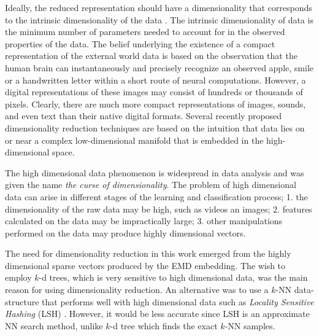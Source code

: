 \iftoggle{edit-mode}{\hspace{0pt}\marginpar{data Intrinsic dimensionality}}{}
Ideally, the reduced representation should have a dimensionality that corresponds to the intrinsic dimensionality of the data \cite{van2009dimensionality}.
The intrinsic dimensionality of data is the minimum number of parameters needed to account for in the observed properties of the data. 
The belief underlying the existence of a compact representation of the external world data is based on the observation that the human brain can instantaneously and precisely recognize an observed apple, smile or a handwritten letter within a short route of neural computations. 
However, a digital representations of these images may consist of hundreds or thousands of pixels. 
Clearly, there are much more compact representations of images, sounds, and even text than their native digital formats. 
Several recently proposed dimensionality reduction techniques are based on the intuition that data lies on or near a complex low-dimensional manifold that is embedded in the high-dimensional space.

\iftoggle{edit-mode}{\hspace{0pt}\marginpar{The curse of dimensionality}}{}
The high dimensional data phenomenon is widespread in data analysis and was given the name \emph{the curse of dimensionality}. 
The problem of high dimensional data can arise in different stages of the learning and classification process; 1. the dimensionality of the raw data may be high, such as videos an images; 2. features calculated on the data may be impractically large; 3. other manipulations performed on the data may produce highly dimensional vectors.

\iftoggle{edit-mode}{\hspace{0pt}\marginpar{Why do we need DR?}}{}
The need for dimensionality reduction in this work emerged from the highly dimensional sparse vectors produced by the EMD embedding. 
The wish to employ $k$-d trees, which is very sensitive to high dimensional data, was the main reason for using dimensionality reduction. 
An alternative was to use a $k$-NN data-structure that performs well with high dimensional data such as \emph{Locality Sensitive Hashing} (LSH) \cite{gionis1999similarity}. 
However, it would be less accurate since LSH is an approximate NN search method, unlike $k$-d tree which finds the exact $k$-NN samples.

